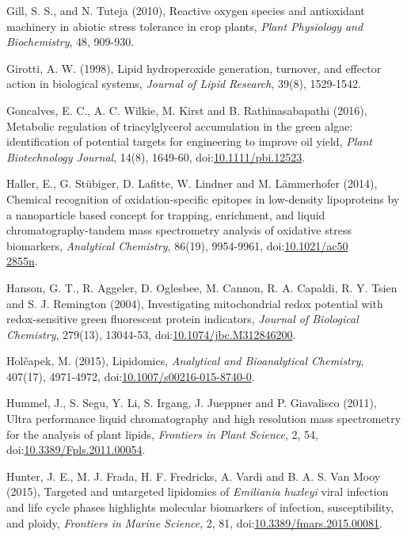 \begin{singlespace}
{{Gill, S. S., and N. Tuteja (2010), Reactive oxygen species and antioxidant machinery in abiotic stress tolerance in crop plants, \emph{Plant Physiology and Biochemistry}, 48, 909-930.

Girotti, A. W. (1998), Lipid hydroperoxide generation, turnover, and effector action in biological systems, \emph{Journal of Lipid Research}, 39(8), 1529-1542.

Goncalves, E. C., A. C. Wilkie, M. Kirst and B. Rathinasabapathi (2016), Metabolic regulation of triacylglycerol accumulation in the green algae: identification of potential targets for engineering to improve oil yield, \emph{Plant Biotechnology Journal}, 14(8), 1649-60, doi:\href{http://dx.doi.org/10.1111/pbi.12523}{10.1111/pbi.12523}.

Haller, E., G. St\"{u}biger, D. Lafitte, W. Lindner and M. L\"{a}mmerhofer (2014), Chemical recognition of oxidation-specific epitopes in low-density lipoproteins by a nanoparticle based concept for trapping, enrichment, and liquid chromatography-tandem mass spectrometry analysis of oxidative stress biomarkers, \emph{Analytical Chemistry}, 86(19), 9954-9961, doi:\href{http://dx.doi.org/10.1021/ac502855n}{10.1021/ac50\\2855n}.

Hanson, G. T., R. Aggeler, D. Oglesbee, M. Cannon, R. A. Capaldi, R. Y. Tsien and S. J. Remington (2004), Investigating mitochondrial redox potential with redox-sensitive green fluorescent protein indicators, \emph{Journal of Biological Chemistry}, 279(13), 13044-53, doi:\href{http://dx.doi.org/10.1074/jbc.M312846200}{10.1074/jbc.M312846200}.

Hol\v{c}apek, M. (2015), Lipidomics, \emph{Analytical and Bioanalytical Chemistry}, 407(17), 4971-4972, doi:\href{http://dx.doi.org/10.1007/s00216-015-8740-0}{10.1007/s00216-015-8740-0}.

Hummel, J., S. Segu, Y. Li, S. Irgang, J. Jueppner and P. Giavalisco (2011), Ultra performance liquid chromatography and high resolution mass spectrometry for the analysis of plant lipids, \emph{Frontiers in Plant Science}, 2, 54, doi:\href{http://dx.doi.org/10.3389/Fpls.2011.00054}{10.3389/Fpls.2011.00054}.

Hunter, J. E., M. J. Frada, H. F. Fredricks, A. Vardi and B. A. S. Van Mooy (2015), Targeted and untargeted lipidomics of \emph{Emiliania huxleyi} viral infection and life cycle phases highlights molecular biomarkers of infection, susceptibility, and ploidy, \emph{Frontiers in Marine Science}, 2, 81, doi:\href{http://dx.doi.org/10.3389/fmars.2015.00081}{10.3389/fmars.2015.00081}.

}}
\end{singlespace}
